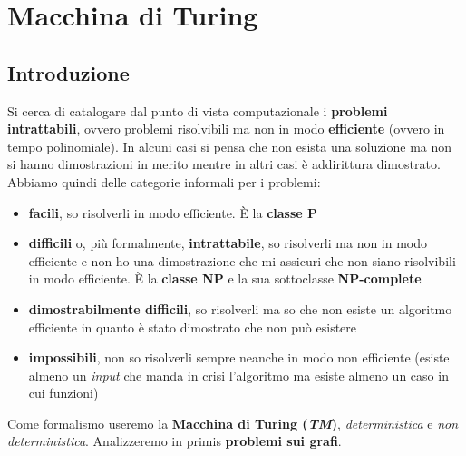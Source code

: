 \chapter{Macchina di Turing}
\section{Introduzione}Si cerca di catalogare dal punto di vista computazionale i \textbf{problemi
  intrattabili}, ovvero problemi risolvibili ma non in modo \textbf{efficiente}
(ovvero in tempo polinomiale). In alcuni casi si pensa che non esista una
soluzione ma non si hanno dimostrazioni in merito mentre in altri casi è
addirittura dimostrato. Abbiamo quindi delle categorie informali per i problemi:
\begin{itemize}
  \item \textbf{facili}, so risolverli in modo efficiente. È la \textbf{classe P}
  \item \textbf{difficili} o, più formalmente, \textbf{intrattabile}, so
  risolverli ma non in modo efficiente e non ho una 
  dimostrazione che mi assicuri che non siano risolvibili in modo efficiente. È
  la \textbf{classe NP} e la sua sottoclasse \textbf{NP-complete}
  \item \textbf{dimostrabilmente difficili}, so risolverli ma so che non esiste
  un algoritmo efficiente in quanto è stato dimostrato che non può esistere
  \item \textbf{impossibili}, non so risolverli sempre neanche in modo non
  efficiente (esiste almeno un \textit{input} che manda in crisi l'algoritmo ma esiste
  almeno un caso in cui funzioni)
\end{itemize}
Come formalismo useremo la \textbf{Macchina di Turing (\textit{TM})},
\textit{deterministica} e \textit{non deterministica}. Analizzeremo in primis
\textbf{problemi sui grafi}. 
